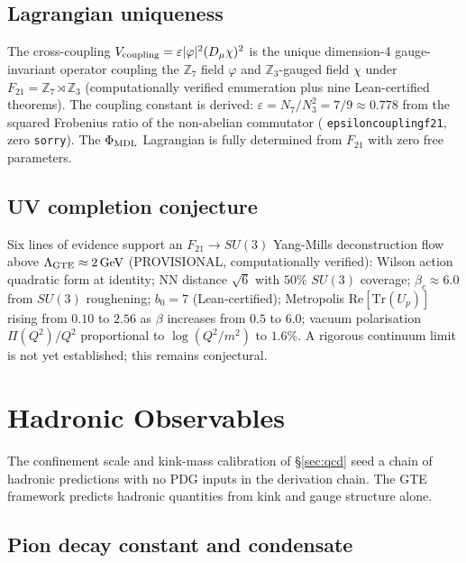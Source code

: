 \documentclass[11pt]{article}
\theoremstyle{remark}
\newcommand{\ZS}{\mathbb{Z}_7}
\newcommand{\Zthree}{\mathbb{Z}_3}
\newcommand{\lean}[1]{%
  \penalty-100
  \begingroup\def\_{\textunderscore\allowbreak}\texttt{#1}\endgroup}
\newcommand{\phimdl}{\Phi_{\rm MDL}}
\newcommand{\Ftwentyone}{F_{21}}
\begin{document}
\subsection{Lagrangian uniqueness}

The cross-coupling $V_{\rm coupling} = \varepsilon|\varphi|^2(D_\mu\chi)^2$ is the
unique dimension-4 gauge-invariant operator coupling the $\ZS$ field $\varphi$ and
$\Zthree$-gauged field $\chi$ under $\Ftwentyone = \ZS \rtimes \Zthree$
(computationally verified enumeration plus nine Lean-certified theorems).
The coupling constant is derived:
$\varepsilon = N_7/N_3^2 = 7/9 \approx 0.778$
from the squared Frobenius ratio of the non-abelian commutator
(\lean{epsilon\_coupling\_f21}, zero \texttt{sorry}).
The $\phimdl$ Lagrangian is fully determined from $\Ftwentyone$ with zero free parameters.

\subsection{UV completion conjecture}

Six lines of evidence support an $\Ftwentyone \to SU(3)$ Yang-Mills deconstruction flow
above $\Lambda_{\rm GTE} \approx 2\,\text{GeV}$ (PROVISIONAL, computationally verified):
Wilson action quadratic form at identity; NN distance $\sqrt{6}$ with $50\%$ $SU(3)$
coverage; $\beta_c \approx 6.0$ from $SU(3)$ roughening; $b_0 = 7$ (Lean-certified);
Metropolis $\mathrm{Re}[\mathrm{Tr}(U_p)]$ rising from $0.10$ to $2.56$ as
$\beta$ increases from $0.5$ to $6.0$; vacuum polarisation $\Pi(Q^2)/Q^2$ proportional
to $\log(Q^2/m^2)$ to $1.6\%$.
A rigorous continuum limit is not yet established; this remains conjectural.

\section{Hadronic Observables}
\label{sec:hadron}

The confinement scale and kink-mass calibration of \S\ref{sec:qcd} seed a chain of
hadronic predictions with no PDG inputs in the derivation chain.
The GTE framework predicts hadronic quantities from kink and gauge structure alone.

\subsection{Pion decay constant and condensate}
\end{document}
